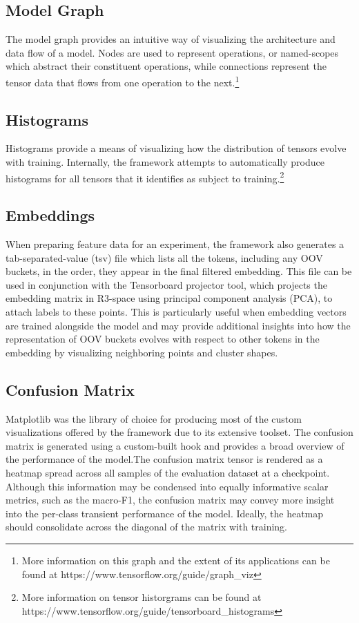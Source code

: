 \documentclass[../../fyp.tex]{subfiles}
\begin{document}
\subsection{Model Graph}
The model graph provides an intuitive way of visualizing the architecture and data flow of a model. Nodes are used to represent operations, or named-scopes which abstract their constituent operations, while connections represent the tensor data that flows from one operation to the next.\footnote{More information on this graph and the extent of its applications can be found at https://www.tensorflow.org/guide/graph\_viz} 

\subsection{Histograms}
Histograms provide a means of visualizing how the distribution of tensors evolve with training. Internally, the framework attempts to automatically produce histograms for all tensors that it identifies as subject to training.\footnote{More information on tensor historgrams can be found at https://www.tensorflow.org/guide/tensorboard\_histograms}

\subsection{Embeddings}
When preparing feature data for an experiment, the framework also generates a tab-separated-value (tsv) file which lists all the tokens, including any OOV buckets, in the order, they appear in the final filtered embedding. This file can be used in conjunction with the Tensorboard projector tool, which projects the embedding matrix in R3-space using principal component analysis (PCA), to attach labels to these points. This is particularly useful when embedding vectors are trained alongside the model and may provide additional insights into how the representation of OOV buckets evolves with respect to other tokens in the embedding by visualizing neighboring points and cluster shapes.

\subsection{Confusion Matrix}
Matplotlib was the library of choice for producing most of the custom visualizations offered by the framework due to its extensive toolset. The confusion matrix is generated using a custom-built hook and provides a broad overview of the performance of the model.The confusion matrix tensor is rendered as a heatmap spread across all samples of the evaluation dataset at a checkpoint. Although this information may be condensed into equally informative scalar metrics, such as the macro-F1, the confusion matrix may convey more insight into the per-class transient performance of the model. Ideally, the heatmap should consolidate across the diagonal of the matrix with training.
\end{document}
